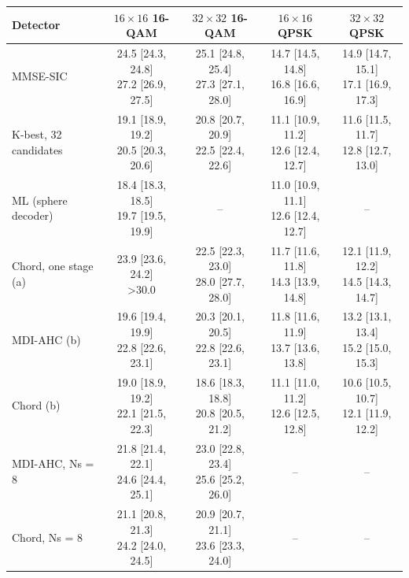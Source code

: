 \begin{tabular}{@{}lcccc@{}}
\toprule
Detector & $16\times16$ 16-QAM & $32\times32$ 16-QAM & $16\times16$ QPSK & $32\times32$ QPSK\\
\midrule
MMSE-SIC & \shortstack{24.5 [24.3, 24.8]\\27.2 [26.9, 27.5]} & \shortstack{25.1 [24.8, 25.4]\\27.3 [27.1, 28.0]} & \shortstack{14.7 [14.5, 14.8]\\16.8 [16.6, 16.9]} & \shortstack{14.9 [14.7, 15.1]\\17.1 [16.9, 17.3]}\\
K-best, 32 candidates & \shortstack{19.1 [18.9, 19.2]\\20.5 [20.3, 20.6]} & \shortstack{20.8 [20.7, 20.9]\\22.5 [22.4, 22.6]} & \shortstack{11.1 [10.9, 11.2]\\12.6 [12.4, 12.7]} & \shortstack{11.6 [11.5, 11.7]\\12.8 [12.7, 13.0]}\\
ML (sphere decoder) & \shortstack{18.4 [18.3, 18.5]\\19.7 [19.5, 19.9]} & -- & \shortstack{11.0 [10.9, 11.1]\\12.6 [12.4, 12.7]} & --\\
Chord, one stage (a) & \shortstack{23.9 [23.6, 24.2]\\>30.0} & \shortstack{22.5 [22.3, 23.0]\\28.0 [27.7, 28.0]} & \shortstack{11.7 [11.6, 11.8]\\14.3 [13.9, 14.8]} & \shortstack{12.1 [11.9, 12.2]\\14.5 [14.3, 14.7]}\\
MDI-AHC (b) & \shortstack{19.6 [19.4, 19.9]\\22.8 [22.6, 23.1]} & \shortstack{20.3 [20.1, 20.5]\\22.8 [22.6, 23.1]} & \shortstack{11.8 [11.6, 11.9]\\13.7 [13.6, 13.8]} & \shortstack{13.2 [13.1, 13.4]\\15.2 [15.0, 15.3]}\\
Chord (b) & \shortstack{19.0 [18.9, 19.2]\\22.1 [21.5, 22.3]} & \shortstack{18.6 [18.3, 18.8]\\20.8 [20.5, 21.2]} & \shortstack{11.1 [11.0, 11.2]\\12.6 [12.5, 12.8]} & \shortstack{10.6 [10.5, 10.7]\\12.1 [11.9, 12.2]}\\
MDI-AHC, Ns = 8 & \shortstack{21.8 [21.4, 22.1]\\24.6 [24.4, 25.1]} & \shortstack{23.0 [22.8, 23.4]\\25.6 [25.2, 26.0]} & -- & --\\
Chord, Ns = 8 & \shortstack{21.1 [20.8, 21.3]\\24.2 [24.0, 24.5]} & \shortstack{20.9 [20.7, 21.1]\\23.6 [23.3, 24.0]} & -- & --\\
\bottomrule
\end{tabular}
